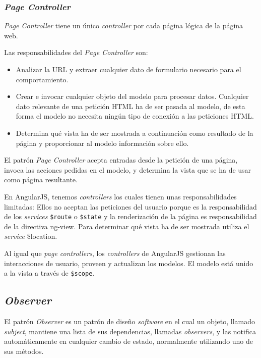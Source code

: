 \subsubsection{\textit{Page Controller}}
\textit{Page Controller} tiene un único \textit{controller} por cada página lógica de la página web\cite{martinfowler2002}.


Las responsabilidades del \textit{Page Controller} son:


\begin{itemize}
\item Analizar la URL y extraer cualquier dato de formulario necesario para el comportamiento.
\item Crear e invocar cualquier objeto del modelo para procesar datos. Cualquier dato relevante de una petición HTML ha de ser pasada al modelo, de esta forma el modelo no necesita ningún tipo de conexión a las peticiones HTML.
\item Determina qué vista ha de ser mostrada a continuación como resultado de la página y proporcionar al modelo información sobre ello.
\end{itemize}


El patrón \textit{Page Controller} acepta entradas desde la petición de una página, invoca las acciones pedidas en el modelo, y determina la vista que se ha de usar como página resultante\cite{page_controller_microsoft}.


En AngularJS, tenemos \textit{controllers} los cuales tienen unas responsabilidades limitadas: Ellos no aceptan las peticiones del usuario porque es la responsabilidad de los \textit{services} \texttt{\$route} o \texttt{\$state} y la renderización de la página es responsabilidad de la directiva ng-view. Para determinar qué vista ha de ser mostrada utiliza el \textit{service} \$location.


Al igual que \textit{page controllers}, los \textit{controllers} de AngularJS gestionan las interacciones de usuario, proveen y actualizan los modelos. El modelo está unido a la vista a través de \texttt{\$scope}\cite{mgechev}.


\subsection{	\textit{Observer}}
El patrón \textit{Observer} es un patrón de diseño \textit{software} en el cual un objeto, llamado \textit{subject}, mantiene una lista de sus dependencias, llamadas \textit{observers}, y las notifica automáticamente en cualquier cambio de estado, normalmente utilizando uno de sus métodos. 


